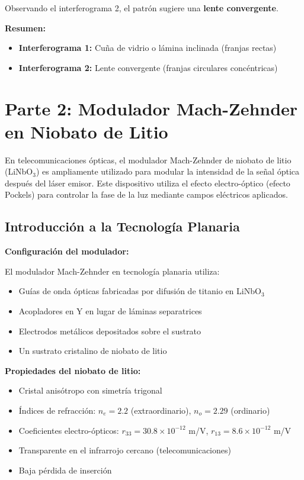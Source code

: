 \documentclass[12pt,a4paper]{article}
\begin{document}
Observando el interferograma 2, el patrón sugiere una \textbf{lente convergente}.

\textbf{Resumen:}

\begin{itemize}
    \item \textbf{Interferograma 1:} Cuña de vidrio o lámina inclinada (franjas rectas)
    \item \textbf{Interferograma 2:} Lente convergente (franjas circulares concéntricas)
\end{itemize}

\section{Parte 2: Modulador Mach-Zehnder en Niobato de Litio}

En telecomunicaciones ópticas, el modulador Mach-Zehnder de niobato de litio (LiNbO$_3$) es ampliamente utilizado para modular la intensidad de la señal óptica después del láser emisor. Este dispositivo utiliza el efecto electro-óptico (efecto Pockels) para controlar la fase de la luz mediante campos eléctricos aplicados.

\subsection{Introducción a la Tecnología Planaria}

\textbf{Configuración del modulador:}

El modulador Mach-Zehnder en tecnología planaria utiliza:
\begin{itemize}
    \item Guías de onda ópticas fabricadas por difusión de titanio en LiNbO$_3$
    \item Acopladores en Y en lugar de láminas separatrices
    \item Electrodos metálicos depositados sobre el sustrato
    \item Un sustrato cristalino de niobato de litio
\end{itemize}

\textbf{Propiedades del niobato de litio:}
\begin{itemize}
    \item Cristal anisótropo con simetría trigonal
    \item Índices de refracción: $n_e = 2.2$ (extraordinario), $n_o = 2.29$ (ordinario)
    \item Coeficientes electro-ópticos: $r_{33} = 30.8 \times 10^{-12}$ m/V, $r_{13} = 8.6 \times 10^{-12}$ m/V
    \item Transparente en el infrarrojo cercano (telecomunicaciones)
    \item Baja pérdida de inserción
\end{itemize}
\end{document}
